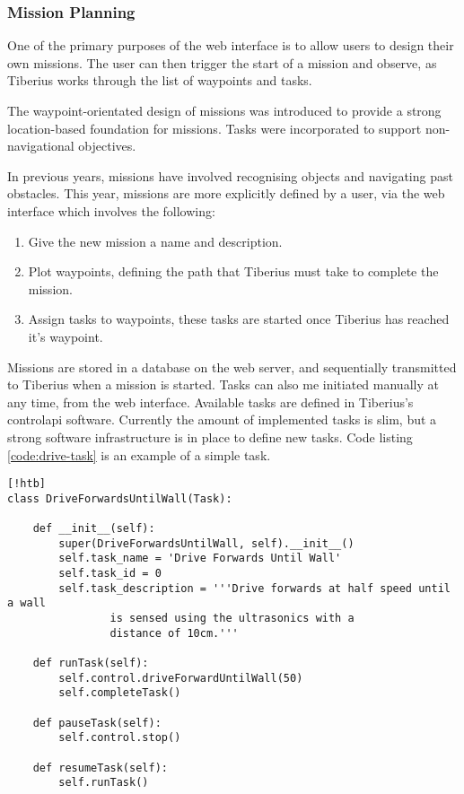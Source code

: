 \subsubsection{Mission Planning}
\label{web-missions} %
\label{sec:web_design_missions}

One of the primary purposes of the web interface is to allow users to design their own missions. The user can then trigger the start of a mission and observe, as Tiberius works through the list of waypoints and tasks.

The waypoint-orientated design of missions was introduced to provide a strong location-based foundation for missions. Tasks were incorporated to support non-navigational objectives.

In previous years, missions have involved recognising objects and navigating past obstacles. This year, missions are more explicitly defined by a user, via the web interface which involves the following:

\begin{enumerate}
\item Give the new mission a name and description.
\item Plot waypoints, defining the path that Tiberius must take to complete the mission.
\item Assign tasks to waypoints, these tasks are started once Tiberius has reached it's waypoint.
\end{enumerate}


Missions are stored in a database on the web server, and sequentially transmitted to Tiberius when a mission is started. Tasks can also me initiated manually at any time, from the web interface. Available tasks are defined in Tiberius's \gls{controlapi} software. Currently the amount of implemented tasks is slim, but a strong software infrastructure is in place to define new tasks. Code listing \ref{code:drive-task} is an example of a simple task.

\begin{lstlisting}[style=custompython,label=code:drive-task][!htb]
class DriveForwardsUntilWall(Task):

    def __init__(self):
        super(DriveForwardsUntilWall, self).__init__()
        self.task_name = 'Drive Forwards Until Wall'
        self.task_id = 0
        self.task_description = '''Drive forwards at half speed until a wall
				is sensed using the ultrasonics with a
				distance of 10cm.'''

    def runTask(self):
        self.control.driveForwardUntilWall(50)
        self.completeTask()

    def pauseTask(self):
        self.control.stop()

    def resumeTask(self):
        self.runTask()
\end{lstlisting}

